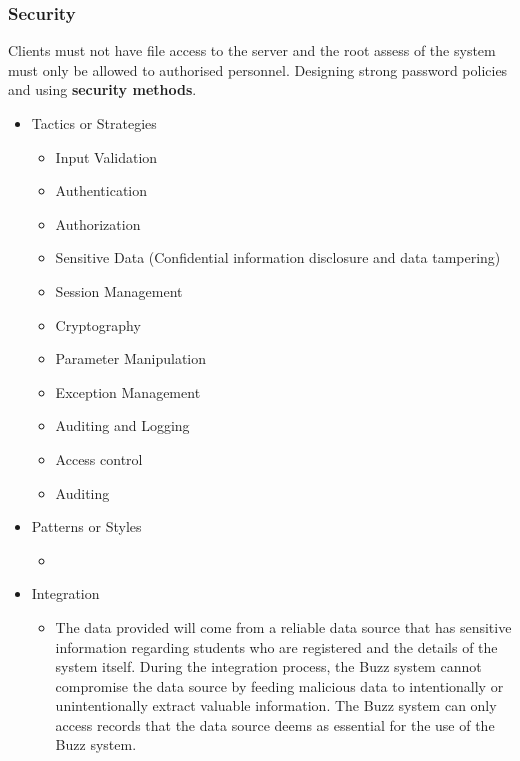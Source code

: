 \subsubsection{Security}
		Clients must not have file access to the server and the root assess of the system must only be allowed to authorised personnel. Designing strong password policies and using \textbf{security methods}.
		\begin{itemize}
	\item{Tactics or Strategies}
		\begin{itemize}
			\item Input Validation
			\item Authentication
			\item Authorization
			\item Sensitive Data (Confidential information disclosure and data tampering)
			\item Session Management
			\item Cryptography
			\item Parameter Manipulation
			\item Exception Management
			\item Auditing and Logging
			\item Access control
			\item Auditing
		\end{itemize}
	\item{Patterns or Styles}
		\begin{itemize}
			\item
		\end{itemize}
	\item{Integration}
		\begin{itemize}
			\item  The data provided will come from a reliable data source that has sensitive information regarding students who are registered and the details of the system itself. During the integration process, the Buzz system cannot compromise the data source by feeding malicious data to intentionally or unintentionally extract valuable information. The Buzz system can only access records that the data source deems as essential for the use of the Buzz system.
		\end{itemize}
\end{itemize}

